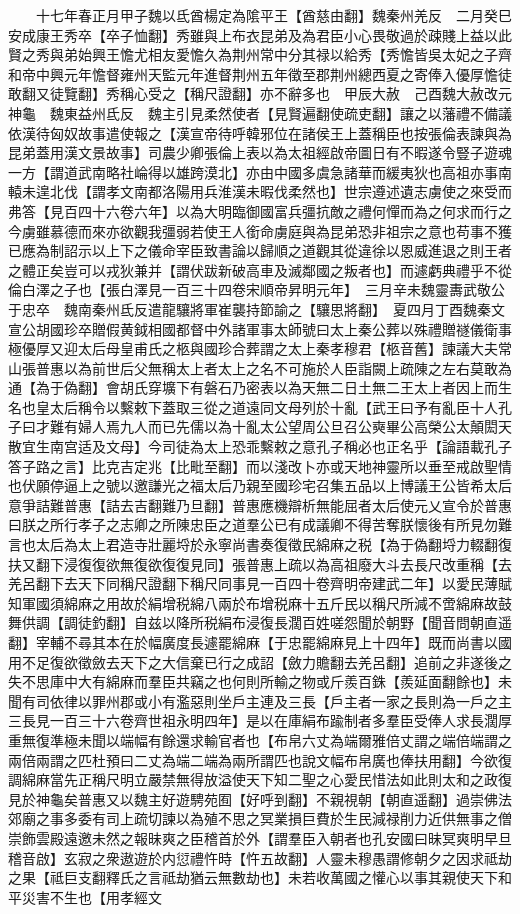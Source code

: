 　　十七年春正月甲子魏以氐酋楊定為隂平王【酋慈由翻】魏秦州羌反　二月癸巳安成康王秀卒【卒子恤翻】秀雖與上布衣昆弟及為君臣小心畏敬過於疎賤上益以此賢之秀與弟始興王憺尤相友愛憺久為荆州常中分其禄以給秀【秀憺皆吳太妃之子齊和帝中興元年憺督雍州天監元年進督荆州五年徵至郡荆州總西夏之寄俸入優厚憺徒敢翻又徒覽翻】秀稱心受之【稱尺證翻】亦不辭多也　甲辰大赦　己酉魏大赦改元神龜　魏東益州氐反　魏主引見柔然使者【見賢遍翻使疏吏翻】讓之以藩禮不備議依漢待匈奴故事遣使報之【漢宣帝待呼韓邪位在諸侯王上蓋稱臣也按張倫表諫與為昆弟蓋用漢文景故事】司農少卿張倫上表以為太祖經啟帝圖日有不暇遂令豎子遊魂一方【謂道武南略社崘得以雄跨漠北】亦由中國多虞急諸華而緩夷狄也高祖亦事南轅未遑北伐【謂孝文南都洛陽用兵淮漢未暇伐柔然也】世宗遵述遺志虜使之來受而弗答【見百四十六卷六年】以為大明臨御國富兵彊抗敵之禮何憚而為之何求而行之今虜雖慕德而來亦欲觀我彊弱若使王人銜命虜庭與為昆弟恐非祖宗之意也苟事不獲已應為制詔示以上下之儀命宰臣致書論以歸順之道觀其從違徐以恩威進退之則王者之體正矣豈可以戎狄兼并【謂伏跋新破高車及滅鄰國之叛者也】而遽虧典禮乎不從倫白澤之子也【張白澤見一百三十四卷宋順帝昇明元年】　三月辛未魏靈夀武敬公于忠卒　魏南秦州氐反遣龍驤將軍崔襲持節諭之【驤思將翻】　夏四月丁酉魏秦文宣公胡國珍卒贈假黄鉞相國都督中外諸軍事太師號曰太上秦公葬以殊禮贈禭儀衛事極優厚又迎太后母皇甫氏之柩與國珍合葬謂之太上秦孝穆君【柩音舊】諫議大夫常山張普惠以為前世后父無稱太上者太上之名不可施於人臣詣闕上疏陳之左右莫敢為通【為于偽翻】會胡氏穿壙下有磐石乃密表以為天無二日土無二王太上者因上而生名也皇太后稱令以繫敕下蓋取三從之道遠同文母列於十亂【武王曰予有亂臣十人孔子曰才難有婦人焉九人而已先儒以為十亂太公望周公旦召公奭畢公高榮公太顛閎天散宜生南宫适及文母】今司徒為太上恐乖繫敕之意孔子稱必也正名乎【論語載孔子答子路之言】比克吉定兆【比毗至翻】而以淺改卜亦或天地神靈所以垂至戒啟聖情也伏願停逼上之號以邀謙光之福太后乃親至國珍宅召集五品以上博議王公皆希太后意爭詰難普惠【詰去吉翻難乃旦翻】普惠應機辯析無能屈者太后使元乂宣令於普惠曰朕之所行孝子之志卿之所陳忠臣之道羣公已有成議卿不得苦奪朕懷後有所見勿難言也太后為太上君造寺壯麗埒於永寧尚書奏復徵民綿麻之税【為于偽翻埒力輟翻復扶又翻下浸復復欲無復欲復復見同】張普惠上疏以為高祖廢大斗去長尺改重稱【去羌呂翻下去天下同稱尺證翻下稱尺同事見一百四十卷齊明帝建武二年】以愛民薄賦知軍國須綿麻之用故於絹增税綿八兩於布增税麻十五斤民以稱尺所減不啻綿麻故鼓舞供調【調徒釣翻】自兹以降所税絹布浸復長濶百姓嗟怨聞於朝野【聞音問朝直遥翻】宰輔不尋其本在於幅廣度長遽罷綿麻【于忠罷綿麻見上十四年】既而尚書以國用不足復欲徵斂去天下之大信棄已行之成詔【斂力贍翻去羌呂翻】追前之非遂後之失不思庫中大有綿麻而羣臣共竊之也何則所輸之物或斤羨百銖【羨延面翻餘也】未聞有司依律以罪州郡或小有濫惡則坐戶主連及三長【戶主者一家之長則為一戶之主三長見一百三十六卷齊世祖永明四年】是以在庫絹布踰制者多羣臣受俸人求長濶厚重無復準極未聞以端幅有餘還求輸官者也【布帛六丈為端爾雅倍丈謂之端倍端謂之兩倍兩謂之匹杜預曰二丈為端二端為兩所謂匹也說文幅布帛廣也俸扶用翻】今欲復調綿麻當先正稱尺明立嚴禁無得放溢使天下知二聖之心愛民惜法如此則太和之政復見於神龜矣普惠又以魏主好遊騁苑囿【好呼到翻】不親視朝【朝直遥翻】過崇佛法郊廟之事多委有司上疏切諫以為殖不思之冥業損巨費於生民減禄削力近供無事之僧崇飾雲殿遠邀未然之報昧爽之臣稽首於外【謂羣臣入朝者也孔安國曰昧冥爽明早旦稽音啟】玄寂之衆遨遊於内愆禮忤時【忤五故翻】人靈未穆愚謂修朝夕之因求祗劫之果【祗巨支翻釋氏之言祗劫猶云無數劫也】未若收萬國之懽心以事其親使天下和平災害不生也【用孝經文